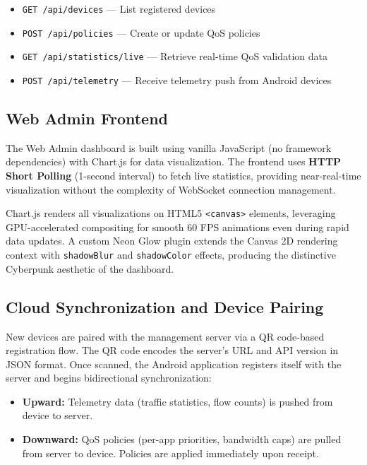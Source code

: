\begin{itemize}[noitemsep]
    \item \texttt{GET /api/devices} --- List registered devices
    \item \texttt{POST /api/policies} --- Create or update QoS policies
    \item \texttt{GET /api/statistics/live} --- Retrieve real-time QoS validation data
    \item \texttt{POST /api/telemetry} --- Receive telemetry push from Android devices
\end{itemize}

\subsection{Web Admin Frontend}

The Web Admin dashboard is built using vanilla JavaScript (no framework dependencies) with Chart.js for data visualization. The frontend uses \textbf{HTTP Short Polling} (1-second interval) to fetch live statistics, providing near-real-time visualization without the complexity of WebSocket connection management.

Chart.js renders all visualizations on HTML5 \texttt{<canvas>} elements, leveraging GPU-accelerated compositing for smooth 60 FPS animations even during rapid data updates. A custom Neon Glow plugin extends the Canvas 2D rendering context with \texttt{shadowBlur} and \texttt{shadowColor} effects, producing the distinctive Cyberpunk aesthetic of the dashboard.

\subsection{Cloud Synchronization and Device Pairing}

New devices are paired with the management server via a QR code-based registration flow. The QR code encodes the server's URL and API version in JSON format. Once scanned, the Android application registers itself with the server and begins bidirectional synchronization:

\begin{itemize}[noitemsep]
    \item \textbf{Upward:} Telemetry data (traffic statistics, flow counts) is pushed from device to server.
    \item \textbf{Downward:} QoS policies (per-app priorities, bandwidth caps) are pulled from server to device. Policies are applied immediately upon receipt.
\end{itemize}

